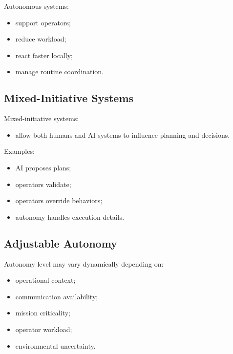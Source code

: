 \documentclass[10pt,a4paper,twocolumn]{article}
\begin{document}
Autonomous systems:
\begin{itemize}
    \item support operators;
    \item reduce workload;
    \item react faster locally;
    \item manage routine coordination.
\end{itemize}


\subsection{Mixed-Initiative Systems}

Mixed-initiative systems:
\begin{itemize}
    \item allow both humans and AI systems to influence planning and decisions.
\end{itemize}

Examples:
\begin{itemize}
    \item AI proposes plans;
    \item operators validate;
    \item operators override behaviors;
    \item autonomy handles execution details.
\end{itemize}


\subsection{Adjustable Autonomy}

Autonomy level may vary dynamically depending on:
\begin{itemize}
    \item operational context;
    \item communication availability;
    \item mission criticality;
    \item operator workload;
    \item environmental uncertainty.
\end{itemize}
\end{document}
